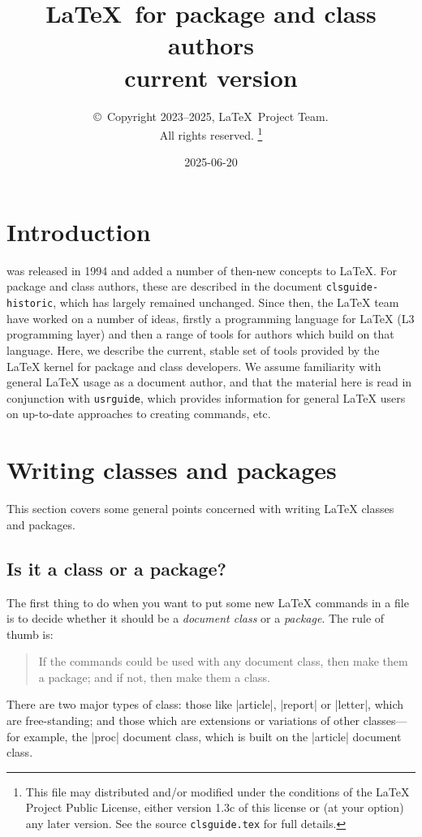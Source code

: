 \documentclass{ltxguide}
\title{\LaTeX\ for package and class authors\\current version}
\author{\copyright~Copyright 2023--2025, \LaTeX\ Project Team.\\
   All rights reserved.%
   \footnote{This file may distributed and/or modified under the
     conditions of the \LaTeX{} Project Public License, either version 1.3c
     of this license or (at your option) any later version. See the source
    \texttt{clsguide.tex} for full details.}%
}
\date{2025-06-20}
\begin{document}
\maketitle

\tableofcontents

\section{Introduction}

\LaTeXe{} was released in 1994 and added a number of then-new concepts to
\LaTeX{}. For package and class authors, these are described in the document
\texttt{clsguide-historic}, which has largely remained unchanged. Since then,
the \LaTeX{} team have worked on a number of ideas, firstly a programming
language for \LaTeX{} (L3 programming layer) and then a range of tools for
authors which build on that language. Here, we describe the current, stable set
of tools provided by the \LaTeX{} kernel for package and class developers. We
assume familiarity with general \LaTeX{} usage as a document author, and that
the material here is read in conjunction with \texttt{usrguide}, which provides
information for general \LaTeX{} users on up-to-date approaches to creating
commands, etc.

\section{Writing classes and packages}
\label{sec:writing}

This section covers some general points concerned with writing
\LaTeX{} classes and packages.

\subsection{Is it a class or a package?}
\label{sec:classorpkg}

The first thing to do when you want to put some new \LaTeX{} commands
in a file is to decide whether it should be a \emph{document class} or a
\emph{package}.  The rule of thumb is:
\begin{quote}
  If the commands could be used with any document class, then make
  them a package; and if not, then make them a class.
\end{quote}

There are two major types of class: those like |article|, |report| or
|letter|, which are free-standing; and those which are extensions or
variations of other classes---for example, the |proc| document class,
which is built on the |article| document class.
\end{document}
